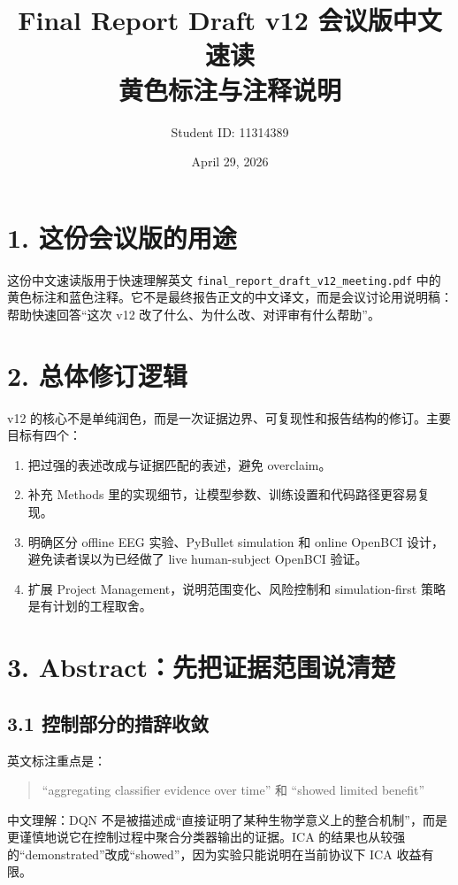 \documentclass[UTF8,12pt,a4paper]{ctexart}
\title{\textbf{Final Report Draft v12 会议版中文速读}\\
\large 黄色标注与注释说明}
\author{Student ID: 11314389}
\date{April 29, 2026}
\newcommand{\keypoint}[1]{\colorbox{hlYellow}{#1}}
\begin{document}
\maketitle

\section*{1. 这份会议版的用途}

这份中文速读版用于快速理解英文 \texttt{final\_report\_draft\_v12\_meeting.pdf} 中的黄色标注和蓝色注释。它不是最终报告正文的中文译文，而是会议讨论用说明稿：帮助快速回答“这次 v12 改了什么、为什么改、对评审有什么帮助”。

\section*{2. 总体修订逻辑}

v12 的核心不是单纯润色，而是一次\keypoint{证据边界、可复现性和报告结构}的修订。主要目标有四个：

\begin{enumerate}
    \item 把过强的表述改成与证据匹配的表述，避免 overclaim。
    \item 补充 Methods 里的实现细节，让模型参数、训练设置和代码路径更容易复现。
    \item 明确区分 offline EEG 实验、PyBullet simulation 和 online OpenBCI 设计，避免读者误以为已经做了 live human-subject OpenBCI 验证。
    \item 扩展 Project Management，说明范围变化、风险控制和 simulation-first 策略是有计划的工程取舍。
\end{enumerate}

\section*{3. Abstract：先把证据范围说清楚}

\subsection*{3.1 控制部分的措辞收敛}

英文标注重点是：
\begin{quote}
``aggregating classifier evidence over time'' 和 ``showed limited benefit''
\end{quote}

中文理解：DQN 不是被描述成“直接证明了某种生物学意义上的整合机制”，而是更谨慎地说它在控制过程中\keypoint{聚合分类器输出的证据}。ICA 的结果也从较强的“demonstrated”改成“showed”，因为实验只能说明在当前协议下 ICA 收益有限。
\end{document}
